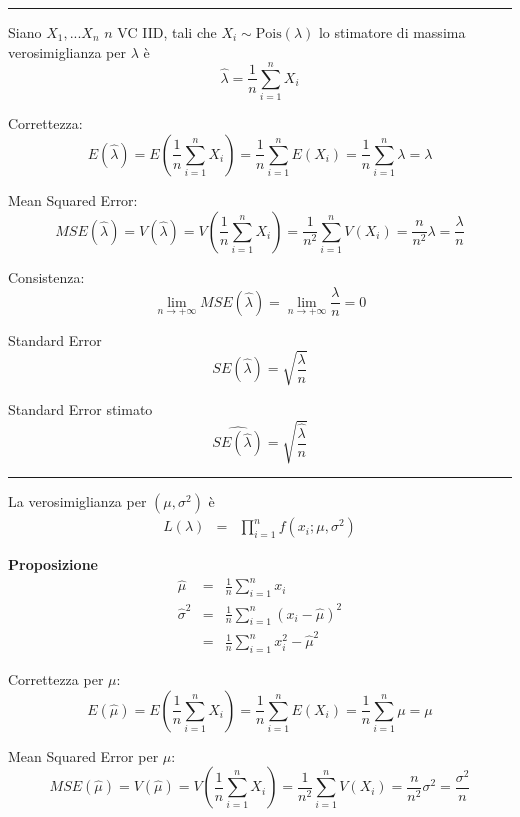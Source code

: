 \documentclass[
  11pt,
]{book}
\theoremstyle{mytheoremstyle}
\theoremstyle{mydefstyle}
\begin{document}
\begin{center}\rule{0.5\linewidth}{0.5pt}\end{center}

Siano \(X_1,...X_n\) \(n\) VC IID, tali che \(X_i\sim\text{Pois}(\lambda)\) lo stimatore
di massima verosimiglianza per \(\lambda\) è
\[\hat \lambda=\frac 1n \sum_{i=1}^nX_i\]

Correttezza:
\[
  E(\hat\lambda) =  E\left(\frac{1}n\sum_{i=1}^n X_i\right) = \frac 1 n \sum_{i=1}^n E(X_i) = \frac 1 n \sum_{i=1}^n \lambda = \lambda
\]

Mean Squared Error:
\[
  MSE(\hat\lambda) = V(\hat\lambda)
                   = V\left(\frac 1 n \sum_{i=1}^n X_i\right)
                 = \frac 1 {n^2} \sum_{i=1}^n V(X_i)
                 = \frac n {n^2} \lambda
                 = \frac {\lambda}n
\]

Consistenza:
\[
  \lim_{n\to+\infty} MSE(\hat\lambda) = \lim_{n\to+\infty} \frac {\lambda}n = 0
\]

Standard Error
\[SE(\hat\lambda)=\sqrt{\frac {\lambda}n}\]

Standard Error stimato
\[\widehat{SE(\hat\lambda)}=\sqrt{\frac {\hat\lambda}n}\]

\begin{center}\rule{0.5\linewidth}{0.5pt}\end{center}

La verosimiglianza per \((\mu,\sigma^2)\) è
\begin{eqnarray*}
  L(\lambda) &=& \prod_{i=1}^n f(x_i;\mu,\sigma^2)
\end{eqnarray*}

\textbf{Proposizione}
\begin{eqnarray*}
  \hat\mu            &=& \frac 1 n \sum_{i=1}^n x_i\\
  \hat\sigma^2       &=& \frac 1 n \sum_{i=1}^n(x_i-\hat\mu)^2\\
                     &=& \frac 1 n \sum_{i=1}^n x_i^2 -\hat\mu^2
\end{eqnarray*}

Correttezza per \(\mu\):
\[
  E(\hat\mu) =  E\left(\frac{1}n\sum_{i=1}^n X_i\right) = \frac 1 n \sum_{i=1}^n E(X_i) = \frac 1 n \sum_{i=1}^n \mu = \mu
\]

Mean Squared Error per \(\mu\):
\[
  MSE(\hat\mu) = V(\hat\mu)
                   = V\left(\frac 1 n \sum_{i=1}^n X_i\right)
                 = \frac 1 {n^2} \sum_{i=1}^n V(X_i)
                 = \frac n {n^2} \sigma^2
                 = \frac {\sigma^2}n
\]
\end{document}
